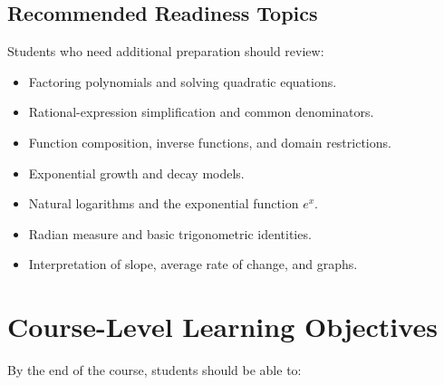 \documentclass[11pt]{article}
\begin{document}
\subsection{Recommended Readiness Topics}

Students who need additional preparation should review:

\begin{itemize}
    \item Factoring polynomials and solving quadratic equations.
    \item Rational-expression simplification and common denominators.
    \item Function composition, inverse functions, and domain restrictions.
    \item Exponential growth and decay models.
    \item Natural logarithms and the exponential function $e^x$.
    \item Radian measure and basic trigonometric identities.
    \item Interpretation of slope, average rate of change, and graphs.
\end{itemize}

\section{Course-Level Learning Objectives}

By the end of the course, students should be able to:
\end{document}
